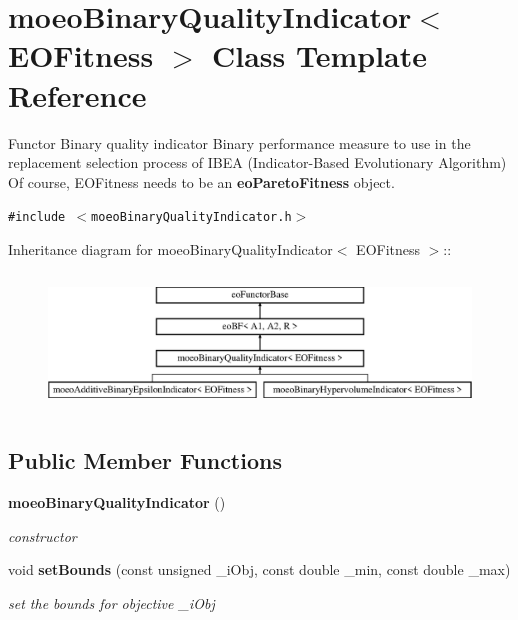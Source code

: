 \section{moeo\-Binary\-Quality\-Indicator$<$ EOFitness $>$ Class Template Reference}
\label{classmoeoBinaryQualityIndicator}
Functor Binary quality indicator Binary performance measure to use in the replacement selection process of IBEA (Indicator-Based Evolutionary Algorithm) Of course, EOFitness needs to be an {\bf eo\-Pareto\-Fitness} object.  


{\tt \#include $<$moeo\-Binary\-Quality\-Indicator.h$>$}

Inheritance diagram for moeo\-Binary\-Quality\-Indicator$<$ EOFitness $>$::\begin{figure}[H]
\begin{center}
\leavevmode
\includegraphics[height=3.67213cm]{classmoeoBinaryQualityIndicator}
\end{center}
\end{figure}
\subsection*{Public Member Functions}
\begin{CompactItemize}
\item 
{\bf moeo\-Binary\-Quality\-Indicator} ()\label{classmoeoBinaryQualityIndicator_a212ae7c8258587a32b158043911cdb6}

\begin{CompactList}\small\item\em constructor \item\end{CompactList}\item 
void {\bf set\-Bounds} (const unsigned \_\-i\-Obj, const double \_\-min, const double \_\-max)
\begin{CompactList}\small\item\em set the bounds for objective \_\-i\-Obj \item\end{CompactList}\end{CompactItemize}
